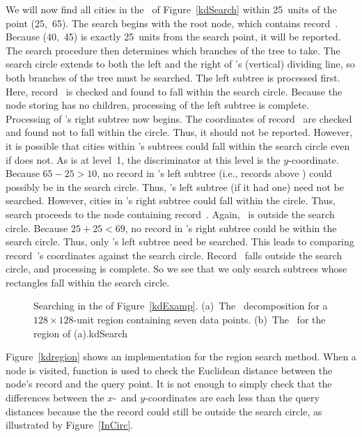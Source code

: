 \begin{example}
We will now find all cities in the \KDtree\ of Figure~\ref{kdSearch}
within 25~units of the point (25,~65).
The search begins with the root node, which contains record~.
Because (40,~45) is exactly 25~units from the search point, it will be
reported.
The search procedure then determines which branches of the tree to
take.
The search circle extends to both the left and the right of 's
(vertical) dividing line, so both branches of the tree must be searched.
The left subtree is processed first.
Here, record~ is checked and found to fall within the search
circle.
Because the node storing  has no children, processing of the
left subtree is complete.
Processing of 's right subtree now begins.
The coordinates of record~ are checked and found not to fall
within the circle.
Thus, it should not be reported.
However, it is possible that cities within 's subtrees could
fall within the search circle even if  does not.
As  is at level~1, the discriminator at this level is the
$y$-coordinate.
Because  $65-25 > 10$, no record in 's left subtree (i.e.,
records above ) could possibly be in the search circle.
Thus, 's left subtree (if it had one) need not be searched.
However, cities in 's right subtree could fall within the
circle.
Thus, search proceeds to the node containing record~.
Again, ~is outside the search circle.
Because $25+25 < 69$, no record in 's right subtree could be
within the search circle.
Thus, only 's left subtree need be searched.
This leads to comparing record~'s coordinates against the search
circle.
Record~ falls outside the search circle, and processing is
complete.
So we see that we only search subtrees whose rectangles fall within
the search circle.
\end{example}

\begin{figure}
\vspace{-\bigskipamount}\vspace{-\smallskipamount}
{Searching in the \KDtree of Figure~\ref{kdExamp}.
(a)~The \KDtree\ decomposition for a $128 \times 128$-unit region
containing seven data points.
(b)~The \KDtree\ for the region of (a).}{kdSearch}
\smallskip
\end{figure}

Figure~\ref{kdregion} shows an implementation for the region search
method.
When a node is visited, function  is used to check the
Euclidean distance between the node's record and the query point.
It is not enough to simply check that the differences between the
$x$-~and $y$-coordinates are each less than the query distances because the
the record could still be outside the search circle, as illustrated by
Figure~\ref{InCirc}.

